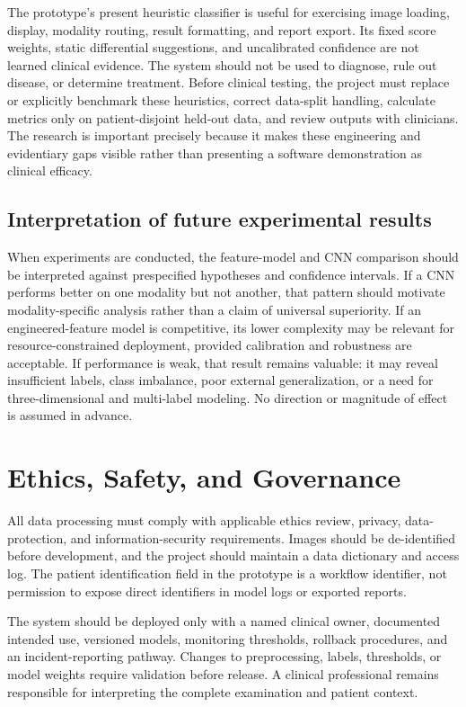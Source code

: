 \documentclass[10pt,a4paper]{article}
\begin{document}
The prototype's present heuristic classifier is useful for exercising image loading, display, modality routing, result formatting, and report export. Its fixed score weights, static differential suggestions, and uncalibrated confidence are not learned clinical evidence. The system should not be used to diagnose, rule out disease, or determine treatment. Before clinical testing, the project must replace or explicitly benchmark these heuristics, correct data-split handling, calculate metrics only on patient-disjoint held-out data, and review outputs with clinicians. The research is important precisely because it makes these engineering and evidentiary gaps visible rather than presenting a software demonstration as clinical efficacy.

\subsection{Interpretation of future experimental results}
When experiments are conducted, the feature-model and CNN comparison should be interpreted against prespecified hypotheses and confidence intervals. If a CNN performs better on one modality but not another, that pattern should motivate modality-specific analysis rather than a claim of universal superiority. If an engineered-feature model is competitive, its lower complexity may be relevant for resource-constrained deployment, provided calibration and robustness are acceptable. If performance is weak, that result remains valuable: it may reveal insufficient labels, class imbalance, poor external generalization, or a need for three-dimensional and multi-label modeling. No direction or magnitude of effect is assumed in advance.

\section{Ethics, Safety, and Governance}
All data processing must comply with applicable ethics review, privacy, data-protection, and information-security requirements. Images should be de-identified before development, and the project should maintain a data dictionary and access log. The patient identification field in the prototype is a workflow identifier, not permission to expose direct identifiers in model logs or exported reports.

The system should be deployed only with a named clinical owner, documented intended use, versioned models, monitoring thresholds, rollback procedures, and an incident-reporting pathway. Changes to preprocessing, labels, thresholds, or model weights require validation before release. A clinical professional remains responsible for interpreting the complete examination and patient context.
\end{document}
